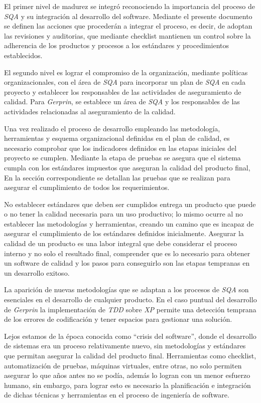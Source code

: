 El primer nivel de madurez se integró reconociendo la importancia del proceso de \emph{SQA} y su integración al desarrollo del software. Mediante el presente documento se definen las acciones que procederán a integrar el proceso, es decir, de adoptan las revisiones y auditorias, que mediante checklist mantienen un control sobre la adherencia de los productos y procesos a los estándares y procedimientos establecidos.

El segundo nivel es lograr el compromiso de la organización, mediante políticas organizacionales, con el área de \emph{SQA} para incorporar un plan de \emph{SQA} en cada proyecto y establecer los responsables de las actividades de aseguramiento de calidad. Para \emph{Gerprin}, se establece un área de \emph{SQA} y los responsables de las actividades relacionadas al aseguramiento de la calidad. 

Una vez realizado el proceso de desarrollo empleando las metodología, herramientas y esquema organizacional definidas en el plan de calidad, es necesario comprobar que los indicadores definidos en las etapas iniciales del proyecto se cumplen. Mediante la etapa de pruebas se asegura que el sistema cumpla con los estándares impuestos que aseguran la calidad del producto final, En la sección correspondiente se detallan las pruebas que se realizan para asegurar el cumplimiento de todos los requerimientos. 

No establecer estándares que deben ser cumplidos entrega un producto que puede o no tener la calidad necesaria para un uso productivo; lo mismo ocurre al no establecer las metodologías y herramientas, creando un camino que es incapaz de asegurar el cumplimiento de los estándares definidos inicialmente. Asegurar la calidad de un producto es una labor integral que debe considerar el proceso interno y no solo el resultado final, comprender que es lo necesario para obtener un software de calidad y los pasos para conseguirlo son las etapas tempranas en un desarrollo exitoso. 

La aparición de nuevas metodologías que se adaptan a los procesos de \emph{SQA} son esenciales en el desarrollo de cualquier producto. En el caso puntual del desarrollo de \emph{Gerprin} la implementación de \emph{TDD} sobre \emph{XP} permite una detección temprana de los errores de codificación y tener espacios para gestionar una solución. 

Lejos estamos de la época conocida como “crisis del software”, donde el desarrollo de sistemas era un proceso relativamente nuevo, sin metodologías y estándares que permitan asegurar la calidad del producto final. Herramientas como checklist, automatización de pruebas, máquinas virtuales, entre otras, no solo permiten asegurar lo que años antes no se podía, además lo logran con un menor esfuerzo humano, sin embargo, para lograr esto es necesario la planificación e integración de dichas técnicas y herramientas en el proceso de ingeniería de software. 
